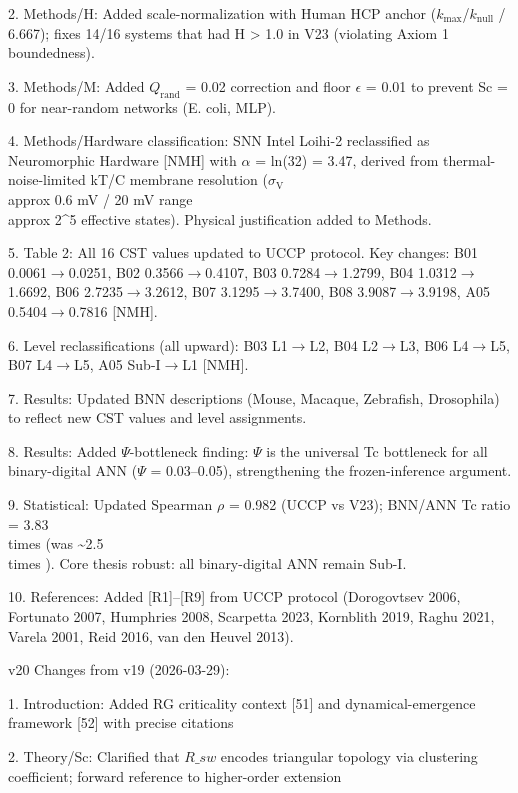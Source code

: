 \documentclass[a4paper,12pt]{article}
\begin{document}
2. Methods/H: Added scale-normalization with Human HCP anchor ($k_{\text{max}}$/$k_{\text{null}}$ / 6.667); fixes 14/16 systems that had H > 1.0 in V23 (violating Axiom 1 boundedness).

3. Methods/M: Added $Q_{\text{rand}}$ = 0.02 correction and floor $\epsilon$ = 0.01 to prevent Sc = 0 for near-random networks (E. coli, MLP).

4. Methods/Hardware classification: SNN Intel Loihi-2 reclassified as Neuromorphic Hardware [NMH] with $\alpha$ = ln(32) = 3.47, derived from thermal-noise-limited kT/C membrane resolution ($\sigma_{\text{V}}$  \\approx  0.6 mV / 20 mV range  \\approx  2^5 effective states). Physical justification added to Methods.

5. Table 2: All 16 CST values updated to UCCP protocol. Key changes: B01 0.0061$\rightarrow$0.0251, B02 0.3566$\rightarrow$0.4107, B03 0.7284$\rightarrow$1.2799, B04 1.0312$\rightarrow$1.6692, B06 2.7235$\rightarrow$3.2612, B07 3.1295$\rightarrow$3.7400, B08 3.9087$\rightarrow$3.9198, A05 0.5404$\rightarrow$0.7816 [NMH].

6. Level reclassifications (all upward): B03 L1$\rightarrow$L2, B04 L2$\rightarrow$L3, B06 L4$\rightarrow$L5, B07 L4$\rightarrow$L5, A05 Sub-I$\rightarrow$L1 [NMH].

7. Results: Updated BNN descriptions (Mouse, Macaque, Zebrafish, Drosophila) to reflect new CST values and level assignments.

8. Results: Added $\Psi$-bottleneck finding: $\Psi$ is the universal Tc bottleneck for all binary-digital ANN ($\Psi$ = 0.03--0.05), strengthening the frozen-inference argument.

9. Statistical: Updated Spearman $\rho$ = 0.982 (UCCP vs V23); BNN/ANN Tc ratio = 3.83 \\times  (was \textasciitilde{}2.5 \\times ). Core thesis robust: all binary-digital ANN remain Sub-I.

10. References: Added [R1]--[R9] from UCCP protocol (Dorogovtsev 2006, Fortunato 2007, Humphries 2008, Scarpetta 2023, Kornblith 2019, Raghu 2021, Varela 2001, Reid 2016, van den Heuvel 2013).

v20 Changes from v19 (2026-03-29):

1. Introduction: Added RG criticality context [51] and dynamical-emergence framework [52] with precise citations

2. Theory/Sc: Clarified that $R\_{sw}$ encodes triangular topology via clustering coefficient; forward reference to higher-order extension
\end{document}

